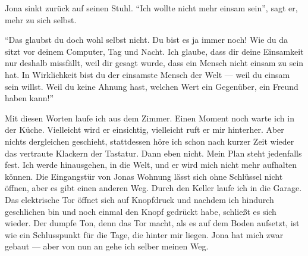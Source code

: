 Jona sinkt zurück auf seinen Stuhl. "`Ich wollte nicht mehr einsam sein"', sagt er, mehr zu sich selbst.

"`Das glaubst du doch wohl selbst nicht. Du bist es ja immer noch! Wie du da sitzt vor deinem Computer, Tag und Nacht. Ich glaube, dass dir deine Einsamkeit nur deshalb missfällt, weil dir gesagt wurde, dass ein Mensch nicht einsam zu sein hat. In Wirklichkeit bist du der einsamste Mensch der Welt --- weil du einsam sein willst. Weil du keine Ahnung hast, welchen Wert ein Gegenüber, ein Freund haben kann!"'

Mit diesen Worten laufe ich aus dem Zimmer. Einen Moment noch warte ich in der Küche. Vielleicht wird er einsichtig, vielleicht ruft er mir hinterher. Aber nichts dergleichen geschieht, stattdessen höre ich schon nach kurzer Zeit wieder das vertraute Klackern der Tastatur. Dann eben nicht. Mein Plan steht jedenfalls fest. Ich werde hinausgehen, in die Welt, und er wird mich nicht mehr aufhalten können. Die Eingangstür von Jonas Wohnung lässt sich ohne Schlüssel nicht öffnen, aber es gibt einen anderen Weg. Durch den Keller laufe ich in die Garage. Das elektrische Tor öffnet sich auf Knopfdruck und nachdem ich hindurch geschlichen bin und noch einmal den Knopf gedrückt habe, schließt es sich wieder. Der dumpfe Ton, denn das Tor macht, als es auf dem Boden aufsetzt, ist wie ein Schlusspunkt für die Tage, die hinter mir liegen. Jona hat mich zwar gebaut --- aber von nun an gehe ich selber meinen Weg.